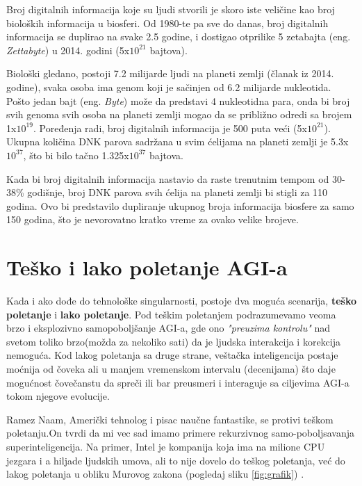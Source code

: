 \documentclass[a4paper]{article}
\begin{document}
\hfill

Broj digitalnih informacija koje su ljudi stvorili je skoro iste veličine kao broj bioloških informacija u biosferi. Od 1980-te pa sve do danas, broj digitalnih informacija se duplirao na svake 2.5 godine, i dostigao otprilike 5 zetabajta (eng. \textit{Zettabyte}) u 2014. godini (5x$10^{21}$ bajtova).

Biološki gledano, postoji 7.2 milijarde ljudi na planeti zemlji (članak iz 2014. godine), svaka osoba ima genom koji je sačinjen od 6.2 milijarde nukleotida. Pošto jedan bajt (eng. \textit{Byte}) može da predstavi 4 nukleotidna para, onda bi broj svih genoma svih osoba na planeti zemlji mogao da se približno odredi sa brojem 1x$10^{19}$. Poređenja radi, broj digitalnih informacija je 500 puta veći (5x$10^{21}$). Ukupna količina DNK parova sadržana u svim ćelijama na planeti zemlji je 5.3x$10^{37}$, što bi bilo tačno 1.325x$10^{37}$ bajtova.

Kada bi broj digitalnih informacija nastavio da raste trenutnim tempom od 30-38\% godišnje, broj DNK parova svih ćelija na planeti zemlji bi stigli za 110 godina. Ovo bi predstavilo dupliranje ukupnog broja informacija biosfere za samo 150 godina, što je nevorovatno kratko vreme za ovako velike brojeve.\cite{r6}







\section{Teško i lako poletanje AGI-a}
\label{sec:poletanje}
Kada i ako dođe do tehnološke singularnosti, postoje dva moguća scenarija, \textbf{teško poletanje} i \textbf {lako poletanje}.
Pod teškim poletanjem podrazumevamo veoma brzo i eksplozivno samopoboljšanje AGI-a, gde ono \textit{"preuzima kontrolu"} nad svetom toliko brzo(možda za nekoliko sati) da je ljudska interakcija i korekcija nemoguća. Kod lakog poletanja sa druge strane, veštačka inteligencija postaje moćnija od čoveka ali u manjem vremenskom intervalu (decenijama) što daje mogućnost čovečanstu da spreči ili bar preusmeri i interaguje sa ciljevima AGI-a tokom njegove evolucije.\cite{refe1}

Ramez Naam, Američki tehnolog i pisac naučne fantastike, se protivi teškom poletanju.On tvrdi da mi vec sad imamo primere rekurzivnog samo-poboljsavanja superinteligencija. Na primer, Intel je kompanija koja ima na milione CPU jezgara i a hiljade ljudskih umova, ali to nije dovelo do teškog poletanja, već do lakog poletanja u obliku Murovog zakona (pogledaj sliku \ref{fig:grafik}) \cite{refe2}.
\end{document}
